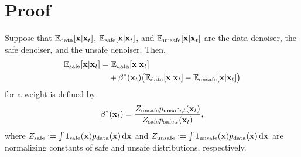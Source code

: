 \section{Proof}
\label{sec:proof}

\begin{reptheorem}%
Suppose that $\mathbb{E}_{\textup{data}}[\mathbf{x}\vert\mathbf{x}_{t}]$, $\mathbb{E}_{\textup{safe}}[\mathbf{x}\vert\mathbf{x}_{t}]$, and $\mathbb{E}_{\textup{unsafe}}[\mathbf{x}\vert\mathbf{x}_{t}]$ are the data denoiser, the safe denoiser, and the unsafe denoiser. Then,
    \begin{align*}%
        \mathbb{E}_{\textup{safe}}[\mathbf{x}\vert\mathbf{x}_{t}]&=\mathbb{E}_{\textup{data}}[\mathbf{x}\vert\mathbf{x}_{t}]\\
        &\quad+\beta^{*}(\mathbf{x}_{t})\big(\mathbb{E}_{\textup{data}}[\mathbf{x}\vert\mathbf{x}_{t}]-\mathbb{E}_{\textup{unsafe}}[\mathbf{x}\vert\mathbf{x}_{t}]\big) \nonumber
    \end{align*}
    for a weight is defined by
    \begin{align*}%
        \beta^{*}(\mathbf{x}_{t}) = \frac{Z_{\textup{unsafe}}p_{\textup{unsafe},t}(\mathbf{x}_{t})}{Z_{\textup{safe}}p_{\textup{safe},t}(\mathbf{x}_{t})},
    \end{align*}
    where $Z_{\textup{safe}}:=\int 1_{\textup{safe}}(\mathbf{x})p_{\textup{data}}(\mathbf{x})\mathop{}\!\mathrm{d}\mathbf{x}$ and $Z_{\textup{unsafe}}:=\int 1_{\textup{unsafe}}(\mathbf{x})p_{\textup{data}}(\mathbf{x})\mathop{}\!\mathrm{d}\mathbf{x}$ are normalizing constants of safe and unsafe distributions, respectively.
\end{reptheorem}

